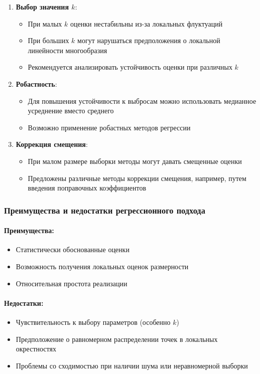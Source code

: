 \documentclass[a4paper,12pt]{article}
\begin{document}
\begin{enumerate}
    \item \textbf{Выбор значения $k$}:
    \begin{itemize}
        \item При малых $k$ оценки нестабильны из-за локальных флуктуаций
        \item При больших $k$ могут нарушаться предположения о локальной линейности многообразия
        \item Рекомендуется анализировать устойчивость оценки при различных $k$
    \end{itemize}

    \item \textbf{Робастность}:
    \begin{itemize}
        \item Для повышения устойчивости к выбросам можно использовать медианное усреднение вместо среднего
        \item Возможно применение робастных методов регрессии
    \end{itemize}

    \item \textbf{Коррекция смещения}:
    \begin{itemize}
        \item При малом размере выборки методы могут давать смещенные оценки
        \item Предложены различные методы коррекции смещения, например, путем введения поправочных коэффициентов
    \end{itemize}
\end{enumerate}

\subsubsection{Преимущества и недостатки регрессионного подхода}

\paragraph{Преимущества:}
\begin{itemize}
    \item Статистически обоснованные оценки
    \item Возможность получения локальных оценок размерности
    \item Относительная простота реализации
\end{itemize}

\paragraph{Недостатки:}
\begin{itemize}
    \item Чувствительность к выбору параметров (особенно $k$)
    \item Предположение о равномерном распределении точек в локальных окрестностях
    \item Проблемы со сходимостью при наличии шума или неравномерной выборки
\end{itemize}
\end{document}
